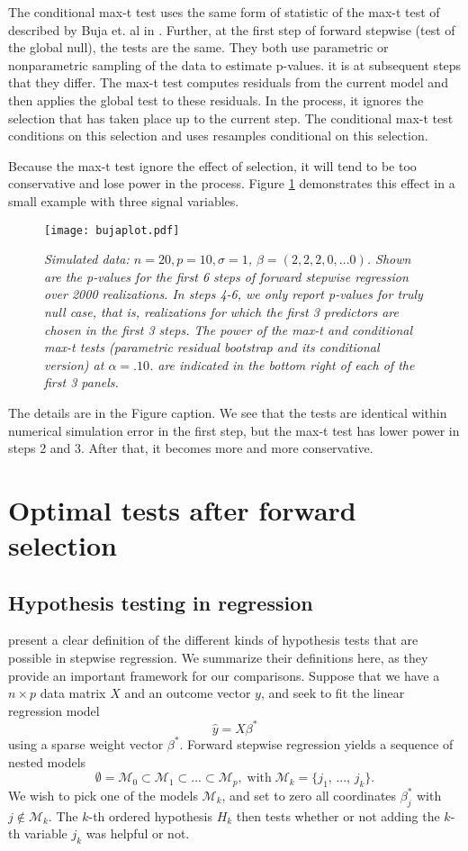 \documentclass{article}
\newcommand{\mm}{\mathcal{M}}
\begin{document}
The conditional max-t test uses the same form of statistic of the max-t test of  described by Buja et. al in \cite{LTTT2014}.
Further, at the first step of forward stepwise (test of the global null), the tests are the same.
They both use parametric or nonparametric sampling of the data to estimate p-values.
it is at subsequent steps that they differ. The max-t test computes residuals from the current model and then applies the global test
to these residuals. In the process, it ignores the selection that has taken place up to the current step. The
conditional max-t test conditions on this selection and uses resamples conditional on this selection.

Because the max-t test ignore the effect of selection, it will tend to be too conservative and lose power in the process.
 Figure \ref{fig:buja} demonstrates this effect in a small example with  three  signal
variables. 
\begin{figure}[hbtp]
\centering
\texttt{[image: bujaplot.pdf]}  
\caption{\em Simulated data: $n=20, p=10, \sigma=1$, $\beta=(2,2,2,0,\ldots 0)$. Shown are the p-values for the first 6 steps of forward stepwise regression over 2000 realizations.
In steps 4-6, we only report p-values for truly null case, that is, realizations for which the first 3 predictors are chosen in the first 3 steps.
The power of the max-t and conditional max-t tests (parametric residual  bootstrap and its conditional version) at $\alpha=.10$. are indicated in the bottom right of each of the first 3 panels.}
\label{fig:buja}
\end{figure}
The details are in the Figure caption. We see that the tests are identical within numerical simulation error in the first step, but the max-t test has lower power
in steps 2 and 3.  After that, it becomes more and more conservative. 

 


\section{Optimal tests after forward selection}
\subsection{Hypothesis testing in regression}
\citet{fdrlasso} present a clear definition of the different kinds of hypothesis tests that are possible in stepwise regression.
We summarize their definitions here, as they provide an important framework for our comparisons.
Suppose that we have a ${n \times p}$ data  matrix $X$  and an outcome vector 
$y$, and seek to fit the linear regression model
$$ \hat y =X \beta ^*$$
using a sparse weight vector $\beta^*$. Forward stepwise regression yields a sequence of nested models
$$ \emptyset = \mm_0 \subset \mm_1 \subset ... \subset \mm_p, \; \text{with} \; \mm_k = \{j_1, \, ..., \, j_k\}. $$
We wish to  pick one of the models $\mm_k$, and
set to zero all coordinates $\beta^*_j$ with $j \notin \mm_k$.
The $k$-th ordered hypothesis $H_k$ then tests whether
or not adding the $k$-th variable $j_k$ was helpful or not. 
\end{document}

